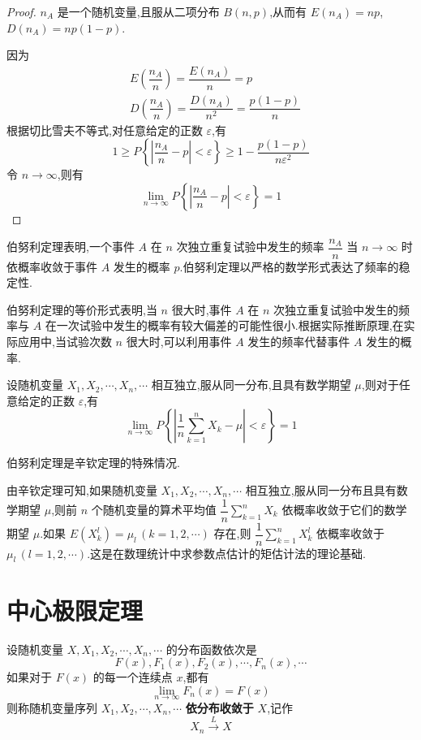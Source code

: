 \begin{proof}
    $n_A$ 是一个随机变量,且服从二项分布 $B(n,p)$,从而有 $E(n_A) = np$,$D(n_A) = np(1-p)$.

    因为
    $$
    \begin{aligned}
        & E(\dfrac{n_A}{n}) = \dfrac{E(n_A)}{n} = p \\
        & D(\dfrac{n_A}{n}) = \dfrac{D(n_A)}{n^2} = \dfrac{p(1-p)}{n}
    \end{aligned}
    $$
    根据切比雪夫不等式,对任意给定的正数 $\varepsilon$,有
    $$
    1 \geqslant P \left\{ \left| \dfrac{n_A}{n} - p \right| < \varepsilon \right\} \geqslant 1 - \dfrac{p(1-p)}{n \varepsilon^2}
    $$
    令 $n \to \infty$,则有
    $$
    \lim_{n \to \infty} P \left\{ \left| \dfrac{n_A}{n} - p \right| < \varepsilon \right\} = 1
    $$
\end{proof}

伯努利定理表明,一个事件 $A$ 在 $n$ 次独立重复试验中发生的频率 $\dfrac{n_A}{n}$ 当 $n \to \infty$ 时依概率收敛于事件 $A$ 发生的概率 $p$.伯努利定理以严格的数学形式表达了频率的稳定性.

伯努利定理的等价形式表明,当 $n$ 很大时,事件 $A$ 在 $n$ 次独立重复试验中发生的频率与 $A$ 在一次试验中发生的概率有较大偏差的可能性很小.根据实际推断原理,在实际应用中,当试验次数 $n$ 很大时,可以利用事件 $A$ 发生的频率代替事件 $A$ 发生的概率.

\begin{theorem}[][辛钦定理]
    设随机变量 $X_1,X_2,\cdots,X_n,\cdots$ 相互独立,服从同一分布,且具有数学期望 $\mu$,则对于任意给定的正数 $\varepsilon$,有
    $$
    \lim_{n \to \infty} P \left\{ \left| \dfrac{1}{n} \sum_{k=1}^n X_k - \mu \right| < \varepsilon \right\} = 1
    $$
\end{theorem}

伯努利定理是辛钦定理的特殊情况.

由辛钦定理可知,如果随机变量 $X_1,X_2,\cdots,X_n,\cdots$ 相互独立,服从同一分布且具有数学期望 $\mu$,则前 $n$ 个随机变量的算术平均值 $\dfrac{1}{n} \displaystyle\sum_{k=1}^n X_k$ 依概率收敛于它们的数学期望 $\mu$.如果 $E(X_k^l) = \mu_l \, (k=1,2,\cdots)$ 存在,则 $\dfrac{1}{n} \displaystyle\sum_{k=1}^n X_k^l$ 依概率收敛于 $\mu_l \, (l=1,2,\cdots)$.这是在数理统计中求参数点估计的矩估计法的理论基础.

\section{中心极限定理}

\begin{definition} \label{def: 依分布收敛}
    设随机变量 $X,X_1,X_2,\cdots,X_n,\cdots$ 的分布函数依次是
    $$
    F(x),F_1(x),F_2(x),\cdots,F_n(x),\cdots
    $$
    如果对于 $F(x)$ 的每一个连续点 $x$,都有
    $$
    \lim_{n \to \infty} F_n(x) = F(x)
    $$
    则称随机变量序列 $X_1,X_2,\cdots,X_n,\cdots$ \textbf{依分布收敛于} $X$,记作
    $$
    X_n \overset{L}{\longrightarrow} X
    $$
\end{definition}

